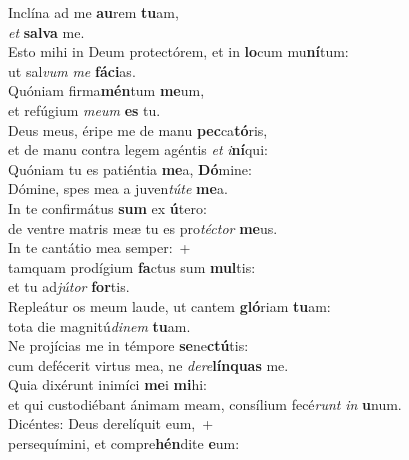 \evenverse Inclína ad me \textbf{au}rem \textbf{tu}am,~\*\\
\evenverse \textit{et} \textbf{sal}\textbf{va} me.\\
\oddverse Esto mihi in Deum protectórem, et in \textbf{lo}cum mu\textbf{ní}tum:~\*\\
\oddverse ut sal\textit{vum} \textit{me} \textbf{fá}\textbf{ci}as.\\
\evenverse Quóniam firma\textbf{mén}tum \textbf{me}um,~\*\\
\evenverse et refúgium \textit{me}\textit{um} \textbf{es} tu.\\
\oddverse Deus meus, éripe me de manu \textbf{pec}ca\textbf{tó}ris,~\*\\
\oddverse et de manu contra legem agéntis \textit{et} \textit{i}\textbf{ní}qui:\\
\evenverse Quóniam tu es patiéntia \textbf{me}a, \textbf{Dó}mine:~\*\\
\evenverse Dómine, spes mea a juven\textit{tú}\textit{te} \textbf{me}a.\\
\oddverse In te confirmátus \textbf{sum} ex \textbf{ú}tero:~\*\\
\oddverse de ventre matris meæ tu es pro\textit{té}\textit{ctor} \textbf{me}us.\\
\evenverse In te cantátio mea semper:~+\\
\evenverse  tamquam prodígium \textbf{fa}ctus sum \textbf{mul}tis:~\*\\
\evenverse et tu ad\textit{jú}\textit{tor} \textbf{for}tis.\\
\oddverse Repleátur os meum laude, ut cantem \textbf{gló}riam \textbf{tu}am:~\*\\
\oddverse tota die magnitú\textit{di}\textit{nem} \textbf{tu}am.\\
\evenverse Ne projícias me in témpore \textbf{se}ne\textbf{ctú}tis:~\*\\
\evenverse cum defécerit virtus mea, ne \textit{de}\textit{re}\textbf{lín}\textbf{quas} me.\\
\oddverse Quia dixérunt inimíci \textbf{me}i \textbf{mi}hi:~\*\\
\oddverse et qui custodiébant ánimam meam, consílium fecé\textit{runt} \textit{in} \textbf{u}num.\\
\evenverse Dicéntes: Deus derelíquit eum,~+\\
\evenverse  persequímini, et compre\textbf{hén}dite \textbf{e}um:~\*\\
